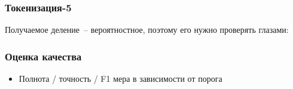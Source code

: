 \documentclass{beamer}
\begin{document}
\begin{frame}
\frametitle{Токенизация-5}
Получаемое деление~-- вероятностное, поэтому его нужно проверять глазами:
\begin{figure}
\end{figure}
\begin{figure}
\end{figure}
\end{frame}

\begin{frame}
\frametitle{Оценка качества}
\begin{itemize}
\item{Полнота / точность / F1 мера в зависимости от порога}
\begin{figure}
\end{figure}
\end{itemize}
\end{frame}
\end{document}
